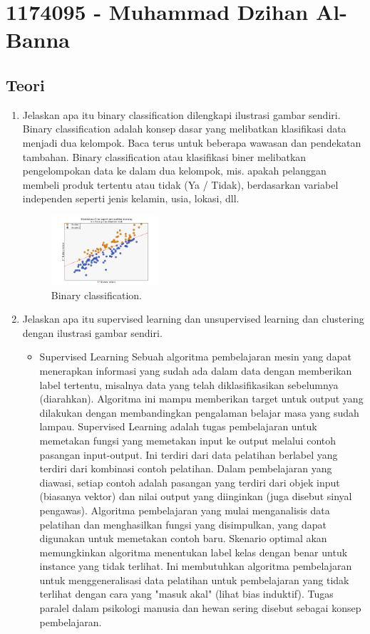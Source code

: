 \section{1174095 - Muhammad Dzihan Al-Banna}
\subsection{Teori}
\begin{enumerate}

	\item Jelaskan apa itu binary classification dilengkapi ilustrasi gambar sendiri.
	\hfill\break
	Binary classification adalah konsep dasar yang melibatkan klasifikasi data menjadi dua kelompok. Baca terus untuk beberapa wawasan dan pendekatan tambahan. Binary classification atau klasifikasi biner melibatkan pengelompokan data ke dalam dua kelompok, mis. apakah pelanggan membeli produk tertentu atau tidak (Ya / Tidak), berdasarkan variabel independen seperti jenis kelamin, usia, lokasi, dll.

	\begin{figure}[H]
	\centering
		\includegraphics[width=4cm]{figures/1174095/tugas2/materi/1.png}
		\caption{Binary classification.}
	\end{figure}

	\item Jelaskan apa itu supervised learning dan unsupervised learning dan clustering dengan ilustrasi gambar sendiri.
	\hfill\break

	\begin{itemize}
		\item Supervised Learning
		\hfill\break
		Sebuah algoritma pembelajaran mesin yang dapat menerapkan informasi yang sudah ada dalam data dengan memberikan label tertentu, misalnya data yang telah diklasifikasikan sebelumnya (diarahkan). Algoritma ini mampu memberikan target untuk output yang dilakukan dengan membandingkan pengalaman belajar masa yang sudah lampau. Supervised Learning adalah tugas pembelajaran untuk memetakan fungsi yang memetakan input ke output melalui contoh pasangan input-output. Ini terdiri dari data pelatihan berlabel yang terdiri dari kombinasi contoh pelatihan. Dalam pembelajaran yang diawasi, setiap contoh adalah pasangan yang terdiri dari objek input (biasanya vektor) dan nilai output yang diinginkan (juga disebut sinyal pengawas). Algoritma pembelajaran yang mulai menganalisis data pelatihan dan menghasilkan fungsi yang disimpulkan, yang dapat digunakan untuk memetakan contoh baru. Skenario optimal akan memungkinkan algoritma menentukan label kelas dengan benar untuk instance yang tidak terlihat. Ini membutuhkan algoritma pembelajaran untuk menggeneralisasi data pelatihan untuk pembelajaran yang tidak terlihat dengan cara yang "masuk akal" (lihat bias induktif). Tugas paralel dalam psikologi manusia dan hewan sering disebut sebagai konsep pembelajaran.


\end{itemize}
\end{enumerate}
